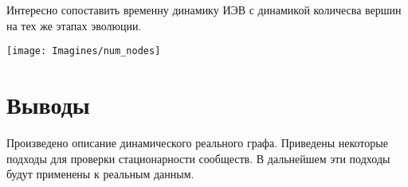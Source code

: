 \documentclass[a4paper,12pt]{article}
\begin{document}
Интересно сопоставить временну динамику ИЭВ с динамикой количесва вершин на тех же этапах эволюции.

\begin{center}
\centering 
\texttt{[image: Imagines/num\_nodes]}
\end{center}

		
		
		
\section{Выводы}
	Произведено описание динамического реального графа. Приведены некоторые подходы для проверки стационарности сообществ. В дальнейшем эти подходы будут применены к реальным данным.


\newpage
 
\end{document}

